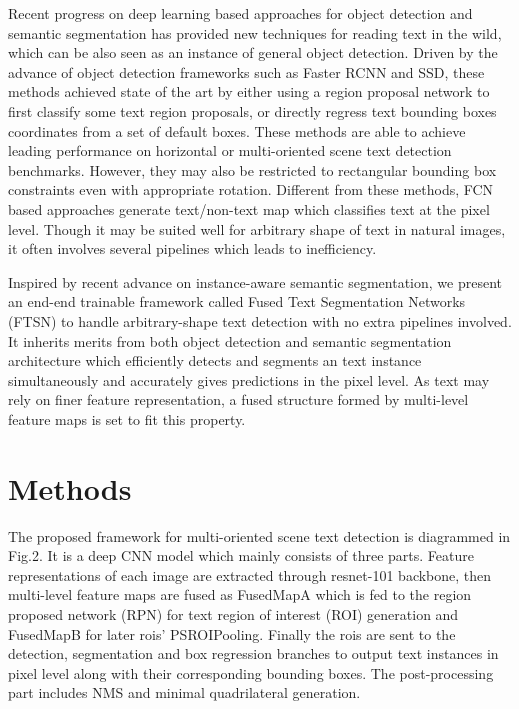 \documentclass[a4paper,conference]{IEEEtran}
\begin{document}
Recent progress on deep learning based approaches for object detection and semantic segmentation  has provided new techniques for reading text in the wild, which can be also seen as an instance of general object detection. Driven by the advance of object detection frameworks such as Faster RCNN\cite{Ren2017Faster} and SSD\cite{liu2016ssd}, these methods achieved state of the art by either using a region proposal network to first classify some text region proposals\cite{Ma2017arbitrary,Qin2017Cascaded}, or directly regress text
bounding boxes coordinates from a set of default boxes\cite{Liao2016TextBoxes,Shi2017Detecting}.
These methods are able to achieve leading performance on horizontal or multi-oriented scene text detection benchmarks. However, they may also be restricted to rectangular bounding box constraints even with appropriate rotation\cite{Liu2017deep}. Different from these methods, FCN based approaches generate text/non-text map which classifies text at the pixel level\cite{zhang2016multi_oriented}. Though it may be suited well for arbitrary shape of text in natural images, it often involves several pipelines which leads to inefficiency\cite{zhang2016multi_oriented,Qin2017Cascaded}. 

Inspired by recent advance on instance-aware semantic segmentation\cite{li2016fully,he2017mask}, we present an end-end trainable framework called Fused Text Segmentation Networks (FTSN) to handle arbitrary-shape text detection with no extra pipelines involved. It inherits merits from both object detection and semantic segmentation architecture which efficiently detects and segments an text instance simultaneously and accurately gives predictions in the pixel level. As text may rely on finer feature representation, a fused structure formed by multi-level feature maps is set to fit this property.   

\section{Methods}
The proposed framework for multi-oriented scene text detection is diagrammed in Fig.2. It is a deep CNN model which mainly consists of three parts. Feature representations of each image are extracted through resnet-101 backbone\cite{he2016deep}, then multi-level feature maps are fused as FusedMapA which is fed to the region proposed network (RPN) for text region of interest (ROI) generation and FusedMapB for later rois' PSROIPooling. Finally the rois are sent to the detection, segmentation and box regression  branches to output text instances in pixel level along with their corresponding bounding boxes. The post-processing part includes NMS and minimal quadrilateral generation.
\end{document}
